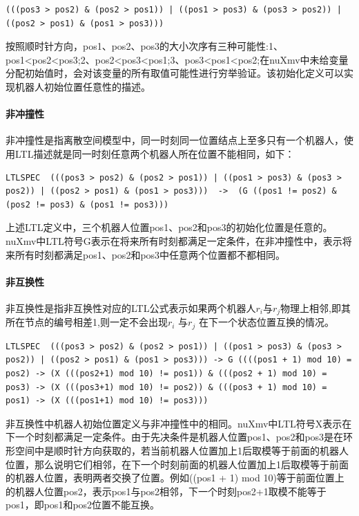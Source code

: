 \begin{lstlisting}
(((pos3 > pos2) & (pos2 > pos1)) | ((pos1 > pos3) & (pos3 > pos2)) | ((pos2 > pos1) & (pos1 > pos3)))
\end{lstlisting}

按照顺时针方向，pos1、pos2、pos3的大小次序有三种可能性:1、pos1<pos2<pos3;2、pos2<pos3<pos1;3、pos3<pos1<pos2;在nuXmv中未给变量分配初始值时，会对该变量的所有取值可能性进行穷举验证。该初始化定义可以实现机器人初始位置任意性的描述。

\paragraph{非冲撞性}
非冲撞性是指离散空间模型中，同一时刻同一位置结点上至多只有一个机器人，使用LTL描述就是同一时刻任意两个机器人所在位置不能相同，如下：

\begin{lstlisting}
LTLSPEC  (((pos3 > pos2) & (pos2 > pos1)) | ((pos1 > pos3) & (pos3 > pos2)) | ((pos2 > pos1) & (pos1 > pos3)))  ->  (G ((pos1 != pos2) & (pos2 != pos3) & (pos1 != pos3)))
\end{lstlisting}

上述LTL定义中，三个机器人位置pos1、pos2和pos3的初始化位置是任意的。nuXmv中LTL符号G表示在将来所有时刻都满足一定条件，在非冲撞性中，表示将来所有时刻都满足pos1、pos2和pos3中任意两个位置都不都相同。

\paragraph{非互换性}
非互换性是指非互换性对应的LTL公式表示如果两个机器人$r_i$与$r_j$物理上相邻,即其所在节点的编号相差1,则一定不会出现$r_i$ 与$r_j$ 在下一个状态位置互换的情况。

\begin{lstlisting}
LTLSPEC  (((pos3 > pos2) & (pos2 > pos1)) | ((pos1 > pos3) & (pos3 > pos2)) | ((pos2 > pos1) & (pos1 > pos3))) -> G ((((pos1 + 1) mod 10) = pos2) -> (X (((pos2+1) mod 10) != pos1)) & (((pos2 + 1) mod 10) = pos3) -> (X (((pos3+1) mod 10) != pos2)) & (((pos3 + 1) mod 10) = pos1) -> (X (((pos1+1) mod 10) != pos3)))
\end{lstlisting}

非互换性中机器人初始位置定义与非冲撞性中的相同。nuXmv中LTL符号X表示在下一个时刻都满足一定条件。由于先决条件是机器人位置pos1、pos2和pos3是在环形空间中是顺时针方向获取的，若当前机器人位置加上1后取模等于前面的机器人位置，那么说明它们相邻，在下一个时刻前面的机器人位置加上1后取模等于前面的机器人位置，表明两者交换了位置。例如((pos1 + 1) mod 10)等于前面位置上的机器人位置pos2，表示pos1与pos2相邻，下一个时刻pos2+1取模不能等于pos1，即pos1和pos2位置不能互换。

